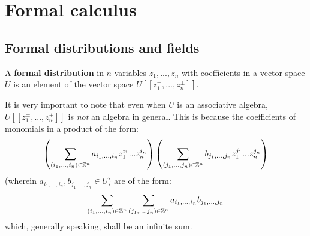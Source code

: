 \section{Formal calculus}
    \subsection{Formal distributions and fields}
        \begin{definition} \label{def: formal_distributions}
            A \textbf{formal distribution} in $n$ variables $z_1, ..., z_n$ with coefficients in a vector space $U$ is an element of the vector space $U[\![z_1^{\pm}, ..., z_n^{\pm}]\!]$.
        \end{definition}
        It is very important to note that even when $U$ is an associative algebra, $U[\![z_1^{\pm}, ..., z_n^{\pm}]\!]$ is \textit{not} an algebra in general. This is because the coefficients of monomials in a product of the form:
            $$\left( \sum_{(i_1, ..., i_n) \in \mathbb{Z}^n} a_{i_1, ..., i_n} z_1^{i_1} ... z_n^{i_n} \right) \left( \sum_{(j_1, ..., j_n) \in \mathbb{Z}^n} b_{j_1, ..., j_n} z_1^{j_1} ... z_n^{j_n} \right)$$
        (wherein $a_{i_1, ..., i_n}, b_{j_1, ..., j_n} \in U$) are of the form:
            $$\sum_{(i_1, ..., i_n) \in \mathbb{Z}^n} \sum_{(j_1, ..., j_n) \in \mathbb{Z}^n} a_{i_1, ..., i_n} b_{j_1, ..., j_n}$$
        which, generally speaking, shall be an infinite sum.

